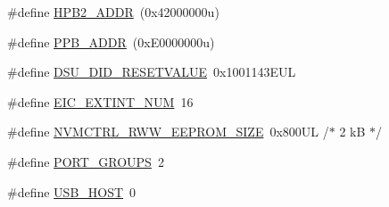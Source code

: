 \begin{DoxyCompactItemize}
\item 
\#define \mbox{\hyperlink{group___s_a_m_d21_e16_l__definitions_gaef42fa53ddf169a2a50be70d29f73571}{H\+P\+B2\+\_\+\+A\+D\+DR}}~(0x42000000u)
\item 
\#define \mbox{\hyperlink{group___s_a_m_d21_e16_l__definitions_ga8895d0a3a9a3126cc44330f86c8ce564}{P\+P\+B\+\_\+\+A\+D\+DR}}~(0x\+E0000000u)
\item 
\#define \mbox{\hyperlink{group___s_a_m_d21_e16_l__definitions_gada75131d542c9e1966238f5488f89bd6}{D\+S\+U\+\_\+\+D\+I\+D\+\_\+\+R\+E\+S\+E\+T\+V\+A\+L\+UE}}~0x1001143\+E\+UL
\item 
\#define \mbox{\hyperlink{group___s_a_m_d21_e16_l__definitions_ga88ebc38c95506296f5d21f82476296ae}{E\+I\+C\+\_\+\+E\+X\+T\+I\+N\+T\+\_\+\+N\+UM}}~16
\item 
\#define \mbox{\hyperlink{group___s_a_m_d21_e16_l__definitions_gacb7a115808eeb0b50bd55888f9ba65ae}{N\+V\+M\+C\+T\+R\+L\+\_\+\+R\+W\+W\+\_\+\+E\+E\+P\+R\+O\+M\+\_\+\+S\+I\+ZE}}~0x800\+U\+L /$\ast$ 2 k\+B $\ast$/
\item 
\#define \mbox{\hyperlink{group___s_a_m_d21_e16_l__definitions_gab9243ffe03a1dc631b57a495b4b3d467}{P\+O\+R\+T\+\_\+\+G\+R\+O\+U\+PS}}~2
\item 
\#define \mbox{\hyperlink{group___s_a_m_d21_e16_l__definitions_ga856aa08fb33114928cbc8635be1792e4}{U\+S\+B\+\_\+\+H\+O\+ST}}~0
\end{DoxyCompactItemize}

